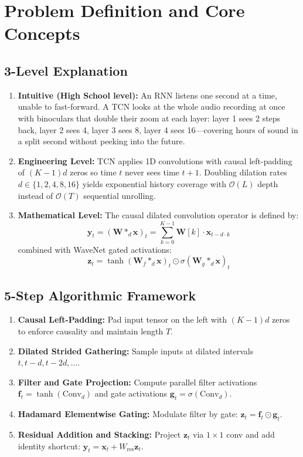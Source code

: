 \documentclass[11pt,a4paper]{article}
\theoremstyle{definition}
\begin{document}
\section{Problem Definition and Core Concepts}

\subsection{3-Level Explanation}
\begin{enumerate}
    \item \textbf{Intuitive (High School level):} An RNN listens one second at a time, unable to fast-forward. A TCN looks at the whole audio recording at once with binoculars that double their zoom at each layer: layer 1 sees 2 steps back, layer 2 sees 4, layer 3 sees 8, layer 4 sees 16—covering hours of sound in a split second without peeking into the future.
    \item \textbf{Engineering Level:} TCN applies 1D convolutions with causal left-padding of $(K-1)d$ zeros so time $t$ never sees time $t+1$. Doubling dilation rates $d \in \{1, 2, 4, 8, 16\}$ yields exponential history coverage with $\mathcal{O}(L)$ depth instead of $\mathcal{O}(T)$ sequential unrolling.
    \item \textbf{Mathematical Level:} The causal dilated convolution operator is defined by:
    \begin{equation}
    \mathbf{y}_t = (\mathbf{W} *_{d} \mathbf{x})_t = \sum_{k=0}^{K-1} \mathbf{W}[k] \cdot \mathbf{x}_{t - d \cdot k}
    \end{equation}
    combined with WaveNet gated activations:
    \begin{equation}
    \mathbf{z}_t = \tanh(\mathbf{W}_f *_{d} \mathbf{x})_t \odot \sigma(\mathbf{W}_g *_{d} \mathbf{x})_t
    \end{equation}
\end{enumerate}

\subsection{5-Step Algorithmic Framework}
\begin{enumerate}
    \item \textbf{Causal Left-Padding:} Pad input tensor on the left with $(K - 1)d$ zeros to enforce causality and maintain length $T$.
    \item \textbf{Dilated Strided Gathering:} Sample inputs at dilated intervals $t, t-d, t-2d, \dots$.
    \item \textbf{Filter and Gate Projection:} Compute parallel filter activations $\mathbf{f}_t = \tanh(\text{Conv}_d)$ and gate activations $\mathbf{g}_t = \sigma(\text{Conv}_d)$.
    \item \textbf{Hadamard Elementwise Gating:} Modulate filter by gate: $\mathbf{z}_t = \mathbf{f}_t \odot \mathbf{g}_t$.
    \item \textbf{Residual Addition and Stacking:} Project $\mathbf{z}_t$ via $1 \times 1$ conv and add identity shortcut: $\mathbf{y}_t = \mathbf{x}_t + W_{\text{res}} \mathbf{z}_t$.
\end{enumerate}
\end{document}
